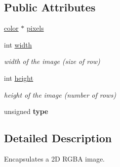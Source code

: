 \subsection*{\-Public \-Attributes}
\begin{DoxyCompactItemize}
\item 
\hyperlink{classcprocessing_1_1color}{color} $\ast$ \hyperlink{classcprocessing_1_1PImage_a6c411ebe0b1bb92e0e17a3e5ffaf7bf0}{pixels}
\item 
\hypertarget{classcprocessing_1_1PImage_a784b1e16d4ccfa218e8cf430ea6ca5ea}{int \hyperlink{classcprocessing_1_1PImage_a784b1e16d4ccfa218e8cf430ea6ca5ea}{width}}\label{classcprocessing_1_1PImage_a784b1e16d4ccfa218e8cf430ea6ca5ea}

\begin{DoxyCompactList}\small\item\em width of the image (size of row) \end{DoxyCompactList}\item 
\hypertarget{classcprocessing_1_1PImage_ac39c77f516dbbe493317455f8b095603}{int \hyperlink{classcprocessing_1_1PImage_ac39c77f516dbbe493317455f8b095603}{height}}\label{classcprocessing_1_1PImage_ac39c77f516dbbe493317455f8b095603}

\begin{DoxyCompactList}\small\item\em height of the image (number of rows) \end{DoxyCompactList}\item 
\hypertarget{classcprocessing_1_1PImage_a465d1a7c776bc7735cc5bdb4dca20586}{unsigned {\bfseries type}}\label{classcprocessing_1_1PImage_a465d1a7c776bc7735cc5bdb4dca20586}

\end{DoxyCompactItemize}


\subsection{\-Detailed \-Description}
\-Encapsulates a 2\-D \-R\-G\-B\-A image. 

